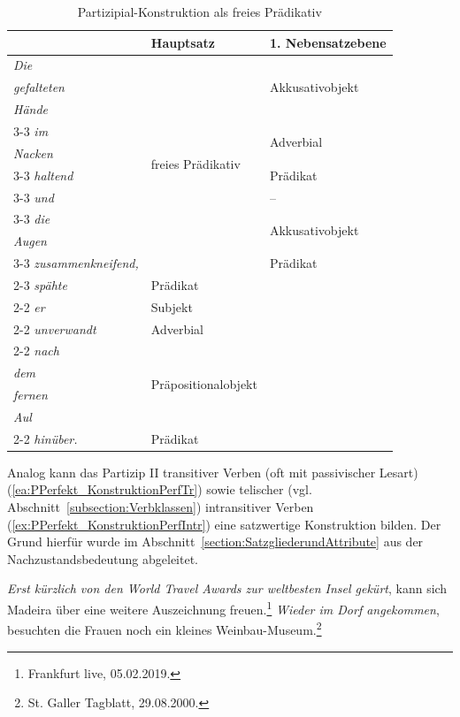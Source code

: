 \begin{table}
  \centering
  \begin{tabular}{l|l|l}
      &  Hauptsatz   &  1. Nebensatzebene \\
    \hline
    \textit{Die} & \multirow{10}{*}{freies Prädikativ}  & \multirow{3}{*}{Akkusativobjekt}\\ 
    \textit{gefalteten} &  & \\ 
    \textit{Hände} & & \\ \cline{3-3}
    \textit{im} & &  \multirow{2}{*}{Adverbial} \\
    \textit{Nacken} & & \\ \cline{3-3}
    \textit{haltend} & & Prädikat \\ \cline{3-3}
    \textit{und} &  & -- \\ \cline{3-3}
    \textit{die} & & \multirow{2}{*}{Akkusativobjekt} \\
    \textit{Augen} & & \\ \cline{3-3}
    \textit{zusammenkneifend,} & & Prädikat \\ \cline{2-3}
    \textit{spähte} & Prädikat & \\ \cline{2-2}
    \textit{er} & Subjekt & \\ \cline{2-2}
    \textit{unverwandt} & Adverbial & \\ \cline{2-2}
    \textit{nach} & \multirow{4}{*}{Präpositionalobjekt} & \\
    \textit{dem} & & \\
    \textit{fernen} & & \\ 
    \textit{Aul} & & \\ \cline{2-2}
    \textit{hinüber.} & Prädikat\\
    \hline 
  \end{tabular}
  \caption{Partizipial-Konstruktion als freies Prädikativ}
  \label{tab:Part_Konstr_fr_Präd}
\end{table}

Analog kann das Partizip II transitiver Verben (oft mit passivischer Lesart) (\ref{ea:PPerfekt_KonstruktionPerfTr}) sowie telischer (vgl. Abschnitt~\ref{subsection:Verbklassen}) intransitiver Verben (\ref{ex:PPerfekt_KonstruktionPerfIntr}) eine satzwertige Konstruktion bilden. Der Grund hierfür wurde im Abschnitt~\ref{section:SatzgliederundAttribute} aus der Nachzustandsbedeutung abgeleitet.

\ea \label{ea:PartPerf_Konstruktion}
\ea \label{ea:PPerfekt_KonstruktionPerfTr} \textit{Erst kürzlich von den World Travel Awards zur weltbesten Insel gekürt}, kann sich Madeira über eine weitere Auszeichnung freuen.\footnote{Frankfurt live, 05.02.2019.}
\ex \label{ex:PPerfekt_KonstruktionPerfIntr} \textit{Wieder im Dorf angekommen}, besuchten die Frauen noch ein kleines Weinbau-Museum.\footnote{St. Galler Tagblatt, 29.08.2000.} 
\z 
\z 

